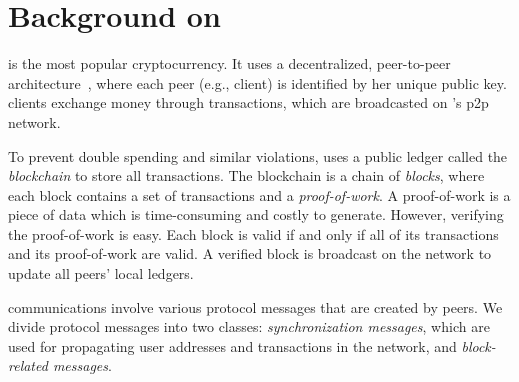 \section{Background on \bc}\label{sec:back}


\bc is the most popular cryptocurrency. It uses  a decentralized, peer-to-peer architecture~\cite{nakamoto2008bitcoin}, where each peer (e.g., client) is identified by her unique public key.  
	\bc clients exchange money through \bc transactions, which are  broadcasted on \bc's p2p network. 

	To prevent double spending and similar violations, \bc uses a public ledger called the \emph{blockchain} to store all \bc transactions. The blockchain is a chain of \emph{blocks}, where  each block contains a set of transactions and a \textit{proof-of-work}. A proof-of-work is a piece of data which is time-consuming and costly to generate. However, verifying the proof-of-work is easy. Each block is valid if and only if all of its transactions and its proof-of-work are valid. A verified block is broadcast on the network to update all peers' local ledgers. 
\begin{comment}	
\paragraphb{\bc's P2P Network.}
	\bc nodes form a full-mesh P2P network, and they connect to each other over unencrypted TCP connections. 
	Each node can connect to up to 125 peers, where up to 8 of them are  outgoing connections and the rest are incoming connections. A node stays connected to a neighbor until they restart or drop, in which case the node tries to replace them~\cite{Bitcoinnetworkoverview}. 
	Blocks and transactions are propagated by gossip. To avoid DoS attacks, peers only forward valid blocks and transactions; invalid blocks are discarded. 
	\end{comment}

	 \bc communications involve various protocol messages that are created by \bc peers. 
	 We divide \bc protocol messages into two classes: \emph{synchronization messages},  which are used for  propagating user addresses and transactions in the \bc network, and \emph{block-related messages}.%
	
